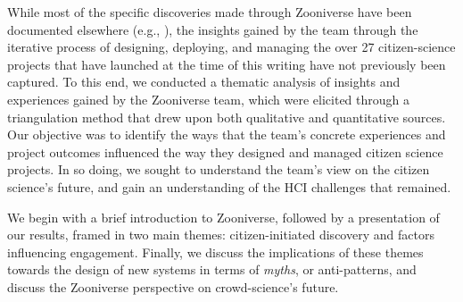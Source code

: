 \documentclass{sigchi}
\begin{document}
While most of the specific discoveries made through Zooniverse have been documented elsewhere (e.g., \cite{lintott2008galaxy,lintott2009galaxy,story-of-the-peas,simpson2013dynamic}), the insights gained by the team through the iterative process of designing, deploying, and managing the over 27 citizen-science projects that have launched at the time of this writing have not previously been captured. To this end, we conducted a thematic analysis of insights and experiences gained by the Zooniverse team, which were elicited through a triangulation method that drew upon both qualitative and quantitative sources.  Our objective was to identify the ways that the team's concrete experiences and project outcomes influenced the way they designed and managed citizen science projects.  In so doing, we sought to understand the team's view on the citizen science's future, and gain an understanding of the HCI challenges that remained.


We begin with a brief introduction to Zooniverse, followed by a presentation of our results, framed in two main themes: citizen-initiated discovery and factors influencing engagement.  Finally, we discuss the implications of these themes towards the design of new systems in terms of \emph{myths}, or anti-patterns, and discuss the Zooniverse perspective on crowd-science's future.

\end{document}
